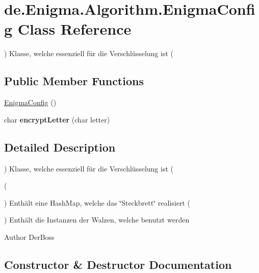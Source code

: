 \hypertarget{classde_1_1_enigma_1_1_algorithm_1_1_enigma_config}{}\section{de.\+Enigma.\+Algorithm.\+Enigma\+Config Class Reference}
\label{classde_1_1_enigma_1_1_algorithm_1_1_enigma_config}


) Klasse, welche essenziell für die Verschlüsselung ist (  


\subsection*{Public Member Functions}
\begin{DoxyCompactItemize}
\item 
\hyperlink{classde_1_1_enigma_1_1_algorithm_1_1_enigma_config_aa6eee4a7c5ca96c781a75b4de0ae8436}{Enigma\+Config} ()
\item 
\mbox{\label{classde_1_1_enigma_1_1_algorithm_1_1_enigma_config_a2788ae04b5cea34f7193e486ced93f21}} 
char {\bfseries encrypt\+Letter} (char letter)
\end{DoxyCompactItemize}


\subsection{Detailed Description}
) Klasse, welche essenziell für die Verschlüsselung ist ( 

(

) Enthält eine Hash\+Map, welche das \char`\"{}\+Steckbrett\char`\"{} realisiert (

) Enthält die Instanzen der Walzen, welche benutzt werden

\begin{DoxyAuthor}{Author}
Der\+Boss 
\end{DoxyAuthor}


\subsection{Constructor \& Destructor Documentation}
\mbox{\label{classde_1_1_enigma_1_1_algorithm_1_1_enigma_config_aa6eee4a7c5ca96c781a75b4de0ae8436}} 
